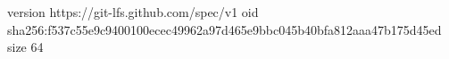 version https://git-lfs.github.com/spec/v1
oid sha256:f537c55e9c9400100ecec49962a97d465e9bbc045b40bfa812aaa47b175d45ed
size 64
